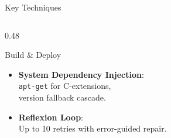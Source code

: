 \documentclass[aspectratio=169]{beamer}
\begin{document}
\begin{frame}{Key Techniques}
\begin{columns}[T]
\begin{column}{0.48\textwidth}
\begin{block}{\faServer\quad Build \& Deploy}
\begin{itemize}\small
  \item \textbf{System Dependency Injection}:\\
        \texttt{apt-get} for C-extensions,\\
        version fallback cascade.
  \item \textbf{Reflexion Loop}:\\
        Up to 10 retries with error-guided repair.
\end{itemize}
\end{block}
\end{column}

\end{columns}
\end{frame}
\end{document}
